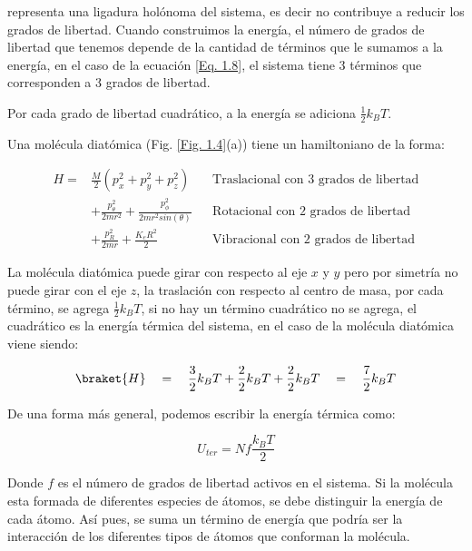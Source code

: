 \documentclass[11pt,fleqn]{book}
\begin{document}
representa una ligadura holónoma del sistema, es decir no contribuye a reducir los grados de libertad. Cuando construimos la energía, el número de grados de libertad que tenemos depende de la cantidad de términos que le sumamos a la energía, en el caso de la ecuación \ref{Eq. 1.8}, el sistema tiene 3 términos que corresponden a 3 grados de libertad.

\begin{theorem}[Equipartición]
Por cada grado de libertad cuadrático, a la energía se adiciona $\frac{1}{2}k_{B}T$.

\begin{example}
Una molécula diatómica (Fig. \ref{Fig. 1.4}(a)) tiene un hamiltoniano de la forma:

\begin{align*}
      H=&\frac{M}{2}\left(p_{x}^{2}+p_{y}^{2}+p_{z}^{2}\right) && \text{Traslacional con 3 grados de libertad}\\
      &+\frac{p_{\theta}^{2}}{2mr^{2}}+\frac{p_{\phi}^{2}}{2mr^{2}sin(\theta)} && \text{Rotacional con 2 grados de libertad}\\
      &+\frac{p_{R}^{2}}{2mr}+\frac{K_{e}R^{2}}{2} && \text{Vibracional con 2 grados de libertad}
\end{align*}

\noindent La molécula diatómica puede girar con respecto al eje $x$ y $y$ pero por simetría no puede girar con el eje $z$, la traslación con respecto al centro de masa, por cada término, se agrega $\frac{1}{2}k_{B}T$, si no hay un término cuadrático no se agrega, el cuadrático es la energía térmica del sistema, en el caso de la molécula diatómica viene siendo:

\begin{equation*}
    \braket{H}\quad=\quad\frac{3}{2}k_{B}T+\frac{2}{2}k_{B}T+\frac{2}{2}k_{B}T\quad=\quad\frac{7}{2}k_{B}T
\end{equation*}
\end{example}
\end{theorem}

De una forma más general, podemos escribir la energía térmica como:

\begin{equation}
    U_{ter}=Nf\frac{k_{B}T}{2}
    \label{Eq. 1.9}
\end{equation}

Donde $f$ es el número de grados de libertad activos en el sistema. Si la molécula esta formada de diferentes especies de átomos, se debe distinguir la energía de cada átomo. Así pues, se suma un término de energía que podría ser la interacción de los diferentes tipos de átomos que conforman la molécula.
\end{document}
